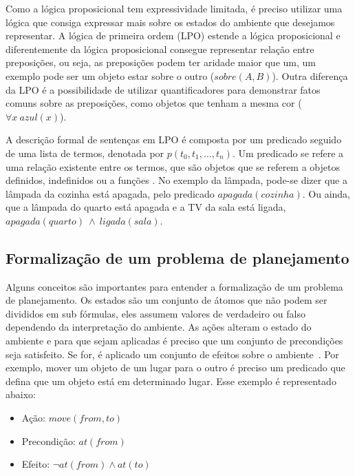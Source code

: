 Como a lógica proposicional tem expressividade limitada, é preciso utilizar uma lógica que consiga expressar mais sobre os estados do ambiente que desejamos representar. 
A lógica de primeira ordem (LPO) estende a lógica proposicional e diferentemente da lógica proposicional consegue representar relação entre preposições, ou seja, as preposições podem ter aridade maior que um, um exemplo pode ser um objeto estar sobre o outro ($sobre(A,B)$). Outra diferença da LPO é a possibilidade de utilizar quantificadores para demonstrar fatos comuns sobre as preposições, como objetos que tenham a mesma cor ($\forall x~ azul(x)$).

A descrição formal de sentenças em LPO é composta por um predicado seguido de uma lista de termos, denotada por $p(t_{0}, t_{1}, ..., t_{n})$. 
Um predicado se refere a uma relação existente entre os termos, que são objetos que se referem a objetos definidos, indefinidos ou a funções \cite[Capítulo 10]{intelligence2003modern}. 
No exemplo da lâmpada, pode-se dizer que a lâmpada da cozinha está apagada, pelo predicado $apagada(cozinha)$. 
Ou ainda, que a lâmpada do quarto está apagada e a TV da sala está ligada, $apagada(quarto)~ \wedge~ ligada(sala)$.  

\subsection{Formalização de um problema de planejamento}
\label{subsec:classicalPlanningForm}

Alguns conceitos são importantes para entender a formalização de um problema de planejamento. 
Os estados são um conjunto de átomos que não podem ser divididos em sub fórmulas, eles assumem valores de verdadeiro ou falso dependendo da interpretação do ambiente.
As ações alteram o estado do ambiente e para que sejam aplicadas é preciso que um conjunto de precondições seja satisfeito.
Se for, é aplicado um conjunto de efeitos sobre o ambiente~\cite[Capítulo 10]{intelligence2003modern}.
Por exemplo, mover um objeto de um lugar para o outro é preciso um predicado que defina que um objeto está em determinado lugar. Esse exemplo é representado abaixo:

\begin{itemize}
	\item Ação: $move(from, to)$
	\item Precondição: $at(from)$
	\item Efeito: $\neg at(from) \wedge at(to)$
\end{itemize}

